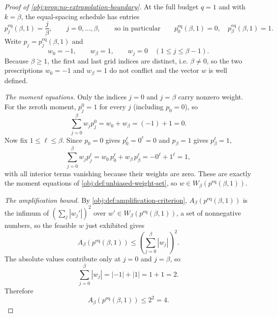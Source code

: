 \begin{proof}[Proof of \cref{obj:prop:no-extrapolation-boundary}]
At the full budget \(q=1\) and with \(k=\beta\), the equal-spacing schedule has entries
\[
p^{\mathrm{eq}}_j(\beta,1)=\frac{j}{\beta},
\qquad j=0,\ldots,\beta,
\qquad\text{so in particular}\qquad
p^{\mathrm{eq}}_0(\beta,1)=0,
\quad
p^{\mathrm{eq}}_\beta(\beta,1)=1 .
\]
Write \(p_j=p^{\mathrm{eq}}_j(\beta,1)\) and
\[
w_0=-1,\qquad w_\beta=1,\qquad w_j=0\quad(1\le j\le\beta-1).
\]
Because \(\beta\ge1\), the first and last grid indices are distinct, i.e. \(\beta\ne0\), so the two prescriptions \(w_0=-1\) and \(w_\beta=1\) do not conflict and the vector \(w\) is well defined. %

\emph{The moment equations.}
Only the indices \(j=0\) and \(j=\beta\) carry nonzero weight. For the zeroth moment, \(p_j^0=1\) for every \(j\) (including \(p_0=0\)), so
\[
\sum_{j=0}^{\beta}w_j p_j^0
=
w_0+w_\beta
=
(-1)+1
=
0.
\] %
Now fix \(1\le\ell\le\beta\). Since \(p_0=0\) gives \(p_0^\ell=0^\ell=0\) and \(p_\beta=1\) gives \(p_\beta^\ell=1\),
\[
\sum_{j=0}^{\beta}w_j p_j^\ell
=
w_0\,p_0^\ell+w_\beta\,p_\beta^\ell
=
-0^\ell+1^\ell
=
1,
\]
with all interior terms vanishing because their weights are zero. These are exactly the moment equations of \cref{obj:def:unbiased-weight-set}, so \(w\in W_\beta(p^{\mathrm{eq}}(\beta,1))\). %

\emph{The amplification bound.}
By \cref{obj:def:amplification-criterion}, \(A_\beta(p^{\mathrm{eq}}(\beta,1))\) is the infimum of \(\left(\sum_j|w_j'|\right)^2\) over \(w'\in W_\beta(p^{\mathrm{eq}}(\beta,1))\), a set of nonnegative numbers, so the feasible \(w\) just exhibited gives
\[
A_\beta\!\left(p^{\mathrm{eq}}(\beta,1)\right)
\le
\left(\sum_{j=0}^{\beta}|w_j|\right)^2.
\] %
The absolute values contribute only at \(j=0\) and \(j=\beta\), so
\[
\sum_{j=0}^{\beta}|w_j|=|-1|+|1|=1+1=2.
\] %
Therefore
\[
A_\beta\!\left(p^{\mathrm{eq}}(\beta,1)\right)\le 2^2=4.
\] %
\end{proof}
